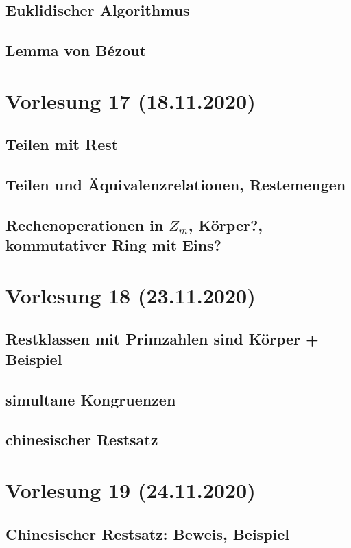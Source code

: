 \documentclass[]{article}
\begin{document}
\subsection{Euklidischer Algorithmus}
\subsection{Lemma von Bézout}



\section{Vorlesung 17 (18.11.2020)}
\subsection{Teilen mit Rest}
\subsection{Teilen und Äquivalenzrelationen, Restemengen}
\subsection{Rechenoperationen in $Z_m$, Körper?, kommutativer Ring mit Eins?}


\section{Vorlesung 18 (23.11.2020)}
\subsection{Restklassen mit Primzahlen sind Körper + Beispiel}
\subsection{simultane Kongruenzen}
\subsection{chinesischer Restsatz}


\section{Vorlesung 19 (24.11.2020)}
\subsection{Chinesischer Restsatz: Beweis, Beispiel}
\end{document}
